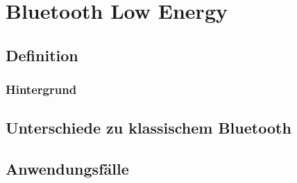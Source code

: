 \chapter{Bluetooth Low Energy}
\label{ch:ble}


\section{Definition}

\subsection{Hintergrund}


\section{Unterschiede zu klassischem Bluetooth}

\section{Anwendungsfälle}


